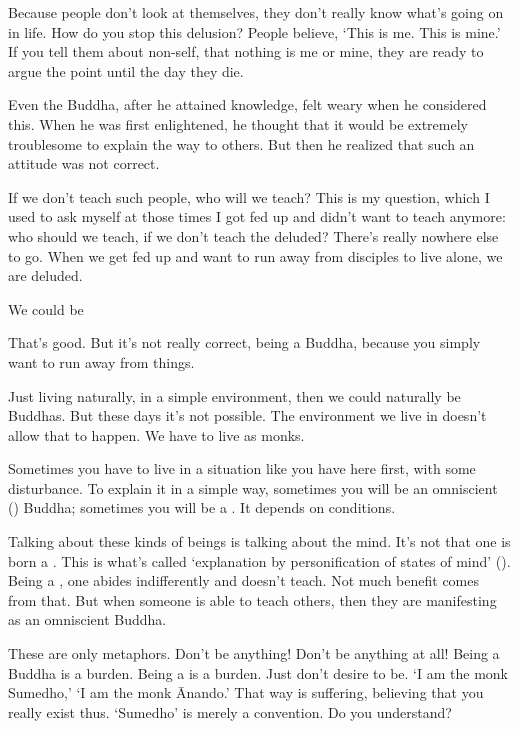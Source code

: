 Because people don't look at themselves, they don't really know what's going on in life. How do you stop this delusion? People believe, `This is me. This is mine.' If you tell them about non-self, that nothing is me or mine, they are ready to argue the point until the day they die.

Even the Buddha, after he attained knowledge, felt weary when he considered this. When he was first enlightened, he thought that it would be extremely troublesome to explain the way to others. But then he realized that such an attitude was not correct.

If we don't teach such people, who will we teach? This is my question, which I used to ask myself at those times I got fed up and didn't want to teach anymore: who should we teach, if we don't teach the deluded? There's really nowhere else to go. When we get fed up and want to run away from disciples to live alone, we are deluded.

 We could be 

 That's good. But it's not really correct, being a  Buddha, because you simply want to run away from things.

 Just living naturally, in a simple environment, then we could naturally be  Buddhas. But these days it's not possible. The environment we live in doesn't allow that to happen. We have to live as monks.

 Sometimes you have to live in a situation like you have here first, with some disturbance. To explain it in a simple way, sometimes you will be an omniscient () Buddha; sometimes you will be a . It depends on conditions.

Talking about these kinds of beings is talking about the mind. It's not that one is born a . This is what's called `explanation by personification of states of mind' (). Being a , one abides indifferently and doesn't teach. Not much benefit comes from that. But when someone is able to teach others, then they are manifesting as an omniscient Buddha.

These are only metaphors. Don't be anything! Don't be anything at all! Being a Buddha is a burden. Being a  is a burden. Just don't desire to be. `I am the monk Sumedho,' `I am the monk \=Anando.' That way is suffering, believing that you really exist thus. `Sumedho' is merely a convention. Do you understand?

